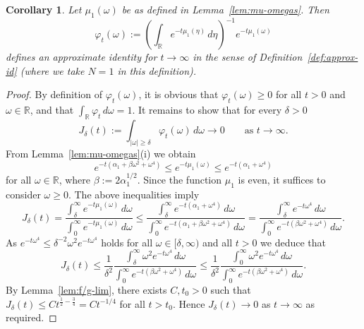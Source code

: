 \documentclass[a4paper, reqno,titlepage]{amsart}
\numberwithin{equation}{section}
\theoremstyle{plain}
\newtheorem{corollary}[theorem]{Corollary}
\theoremstyle{definition}
\theoremstyle{remark}
\newcommand{\RR}{\mathbb{R}}
\begin{document}
\begin{corollary}
  \label{cor:approx-id-mu}
  Let $\mu_1(\omega)$ be as defined in Lemma~\ref{lem:mu-omegas}. Then
  \begin{equation*}
    \varphi_t(\omega) := \left(\int_{\RR} e^{-t \mu_1(\eta)} \,d\eta \right)^{-1}e^{-t\mu_1(\omega)}
  \end{equation*}
  defines an approximate identity for $t \to \infty$ in the sense of Definition~\ref{def:approx-id} (where we take $N=1$ in this definition).
\end{corollary}
\begin{proof}
  By definition of $\varphi_t(\omega)$, it is obvious that $\varphi_t(\omega) \geq 0$ for all $t>0$ and $\omega \in \RR$, and that $\int_\RR \varphi_t \,d\omega = 1$. It remains to show that for every $\delta>0$
  \begin{equation}
    \label{eq:approx-id-mu}
    J_\delta(t):=\int_{|\omega| \ge \delta} \varphi_t(\omega) \,d \omega \longrightarrow 0 \qquad \text{as } t \to \infty.
  \end{equation}
  From Lemma~\ref{lem:mu-omegas}(i) we obtain
  \begin{equation*}
    e^{-t(\alpha_1 + \beta \omega^2 + \omega^4)} \leq e^{-t \mu_1(\omega)} \leq e^{-t(\alpha_1 + \omega^4)}
  \end{equation*}
  for all $\omega \in \RR$, where $\beta := 2 \alpha_1^{1/2}$. Since the function $\mu_1$ is even, it suffices to consider $\omega \ge 0$. The above inequalities imply
  \begin{equation*}
    J_\delta(t)
    = \frac{ \int_\delta^\infty e^{-t \mu_1(\omega)}\,d \omega }{ \int_0^\infty e^{-t \mu_1(\omega)} \,d \omega }
    \leq \frac{ \int_\delta^\infty e^{-t(\alpha_1 + \omega^4)} \,d\omega}
    { \int_0^\infty e^{-t(\alpha_1 + \beta \omega^2 + \omega^4)} \,d\omega }
    = \frac{ \int_\delta^\infty e^{-t \omega^4} \,d\omega }
    { \int_0^\infty e^{-t(\beta \omega^2 + \omega^4)} \,d\omega }.
  \end{equation*}
  As $e^{-t \omega^4} \leq \delta^{-2} \omega^2 e^{-t\omega^4}$ holds for all $\omega \in [\delta, \infty)$ and all $t>0$ we deduce that
  \begin{equation*}
    J_\delta(t)
    \leq \frac{1}{\delta^2}
    \frac{ \int_\delta^\infty \omega^2 e^{-t \omega^4} \,d\omega }
    { \int_0^\infty e^{-t(\beta \omega^2 + \omega^4)} \,d\omega }
    \leq \frac{1}{\delta^2}
    \frac{ \int_0^\infty \omega^2 e^{-t \omega^4} \,d\omega }
    { \int_0^\infty e^{-t(\beta \omega^2 + \omega^4)} \,d\omega }.
  \end{equation*}
  By Lemma~\ref{lem:f/g-lim}, there exists $C,t_0>0$ such that $J_\delta(t)\leq Ct^{\frac{1}{2}-\frac{3}{4}}=Ct^{-1/4}$ for all $t>t_0$. Hence $J_\delta(t)\to 0$ as $t\to\infty$ as required.
\end{proof}
\end{document}
